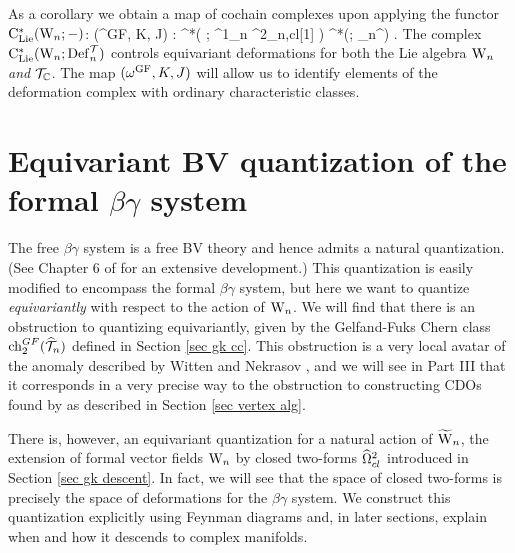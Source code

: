 As a corollary we obtain a map of cochain complexes upon
applying the functor ${\rm C}_{{\rm Lie}}^*({{\rm W}_n} ; -)$:
\ben
(\omega^{GF}, K, J) : \CC[-1] \oplus \clie^*\left( \Vect ; \Omega^1_{n} \oplus
\Omega^2_{n,cl}[1] \right) \to \clie^*(\Vect ; \Def_n^\cT) .
\een 
The complex ${\rm C}_{{\rm Lie}}^*({{\rm W}_n} ; {\rm Def}_n^\mathcal T)$ controls equivariant
deformations for both the Lie algebra ${{\rm W}_n}$ {\em and} $\mathcal T_\mathbb C$. The
map $(\omega^{{\rm GF}},K,J)$ will allow us to identify elements of the
deformation complex with ordinary characteristic classes. 


\section{Equivariant BV quantization of the formal $\beta\gamma$
  system}\label{sec equiv bv}

The free $\beta\gamma$ system is a free BV theory and hence admits a natural quantization.
(See Chapter 6 of \cite{GwThesis} for an extensive development.)  
This quantization is easily modified to encompass the formal $\beta\gamma$ system,
but here we want to quantize \emph{equivariantly} with respect to the action of ${{\rm W}_n}$.
We will find that there is an obstruction to quantizing equivariantly, 
given by the Gelfand-Fuks Chern class ${\rm ch}_2^{GF}(\widehat{\mathcal T}_n)$ defined in Section \ref{sec gk cc}. 
This obstruction is a very local avatar of the anomaly described by Witten and Nekrasov \cite{WittenCDO,Nek},
and we will see in Part III that it corresponds in a very precise way to the obstruction to constructing CDOs
found by \cite{MSV, GMS} as described in Section \ref{sec vertex alg}.

There is, however, an equivariant quantization for a natural action of $\widetilde{{{\rm W}}}_n$, 
the extension of formal vector fields ${{\rm W}_n}$ by closed two-forms
$\widehat{\Omega}^2_{cl}$ introduced in Section \ref{sec gk descent}. 
In fact, we will see that the space of closed two-forms is precisely the space of deformations for the $\beta\gamma$ system. 
We construct this quantization explicitly using Feynman diagrams and, in later sections, explain when and how it descends to complex manifolds.

